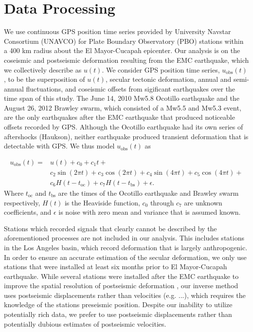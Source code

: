 \documentclass[12pt]{article}
\begin{document}
\section*{Data Processing}

We use continuous GPS position time series provided by University Navstar Consortium (UNAVCO) for Plate Boundary Observatory (PBO) stations within a 400 km radius about the El Mayor-Cucapah epicenter. Our analysis is on the coseismic and postseismic deformation resulting from the EMC earthquake, which we collectively describe as $u(t)$. We consider GPS position time series, $u_\mathrm{obs}(t)$, to be the superposition of $u(t)$, secular tectonic deformation, annual and semi-annual fluctuations, and coseismic offsets from sigificant earthquakes over the time span of this study.  The June 14, 2010 Mw5.8 Ocotillo earthquake and the August 26, 2012 Brawley swarm, which consisted of a Mw5.5 and Mw5.3 event, are the only earthquakes after the EMC earthquake that produced noticeable offsets recorded by GPS. Although the Ocotillo earthquake had its own series of aftershocks (Haukson), neither earthquake produced transient deformation that is detectable with GPS. We thus model $u_\mathrm{obs}(t)$ as 

\begin{equation}\label{TimeSeriesModel}
  \begin{split}  
    u_\mathrm{obs}(t) = &u(t) + c_0 + c_1t + \\
                       &c_2\sin(2\pi t) + c_3\cos(2\pi t) + c_4\sin(4\pi t) + c_5\cos(4\pi t) + \\
                       &c_6H(t-t_\mathrm{oc}) + c_7H(t-t_\mathrm{bs}) + \epsilon.
  \end{split}
\end{equation}
Where $t_\mathrm{oc}$ and $t_\mathrm{bs}$ are the times of the Ocotillo earthquake and Brawley swarm respectively, $H(t)$ is the Heaviside function, $c_0$ through $c_7$ are unknown coefficients, and $\epsilon$ is noise with zero mean and variance that is assumed known.

Stations which recorded signals that clearly cannot be described by the aforementioned processes are not included in our analysis. This includes stations in the Los Angeles basin, which record deformation that is largely anthropogenic. In order to ensure an accurate estimation of the secular deformation, we only use stations that were installed at least six months prior to El Mayor-Cucapah earthquake. While several stations were installed after the EMC earthquake to improve the spatial resolution of postseismic deformation \cite{Spinler2015}, our inverse method uses postseismic displacements rather than velocities (e.g. ...), which requires the knowledge of the stations preseismic position. Despite our inability to utilize potentially rich data, we prefer to use postseismic displacements rather than potentially dubious estimates of postseismic velocities.
\end{document}
